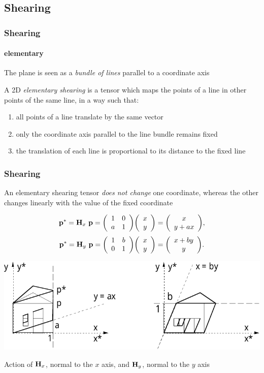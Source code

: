 \documentclass{beamer}
\begin{document}
\subsection{Shearing}
\begin{frame}\frametitle{Shearing}
\framesubtitle{elementary}

\vfill

The plane is seen as a \emph{bundle of lines} parallel to a coordinate axis

\vfill

A 2D \emph{elementary shearing} is a tensor which maps the points of a line in other points of the same line, in a way such that:

\vfill

\begin{enumerate}
    \vfill\item all points of a line translate by the same vector
    \vfill\item only the coordinate axis parallel to the line bundle remains fixed
    \vfill\item the translation of each line is proportional to its distance to the fixed line

\end{enumerate}
\vfill
\end{frame}
\begin{frame}\frametitle{Shearing} \small

\vfill
An elementary shearing tensor \emph{does not change} one coordinate, whereas the other changes linearly with the value of the fixed coordinate

\[
{\bf p}^* = {\bf H}_x\ {\bf p} = {\left(\begin{array}{cccccccccccccccccccccccccccc} 1 & 0\\
a & 1\end{array}\right)} {\left(\begin{array}{cccccccccccccccccccc} x \\ y\end{array}\right)} = {\left(\begin{array}{cccccccccccccccccccc} x \\ y + ax \end{array}\right)} ,
\]\vspace{-2mm}
\[
{\bf p}^* = {\bf H}_y\ {\bf p} = {\left(\begin{array}{cccccccccccccccccccccccccccc} 1 & b\\
0 & 1 \end{array}\right)} {\left(\begin{array}{cccccccccccccccccccc} x \\ y \end{array}\right)} = {\left(\begin{array}{cccccccccccccccccccc} x + by \\ y \end{array}\right)} .
\]

\vfill
\centering\includegraphics[width=0.8\linewidth]{images/deform}

Action of ${\bf H}_{x}$, normal to the $x$ axis, and ${\bf H}_{y}$, normal to the $y$ axis
\end{frame}
\end{document}
